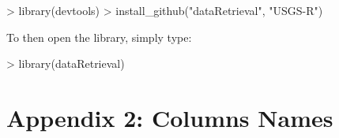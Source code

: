 \documentclass[a4paper,11pt]{article}
\begin{document}
\begin{Schunk}
\begin{Sinput}
> library(devtools)
> install_github("dataRetrieval", "USGS-R")
\end{Sinput}
\end{Schunk}
To then open the library, simply type:

\begin{Schunk}
\begin{Sinput}
> library(dataRetrieval)
\end{Sinput}
\end{Schunk}


\section{Appendix 2: Columns Names}
\label{sec:appendix2}
\end{document}
